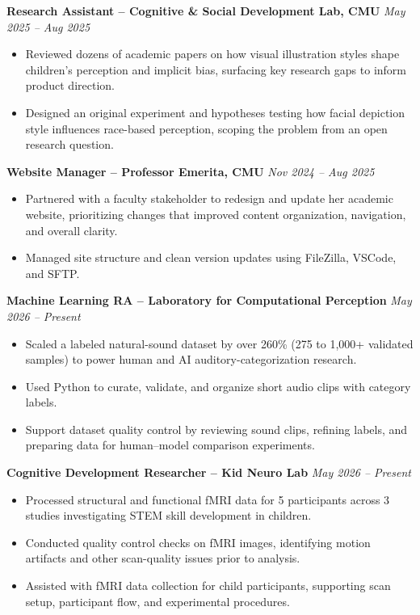 \documentclass[10.5pt]{article}
\begin{document}
\noindent\textbf{Research Assistant – Cognitive \& Social Development Lab, CMU} \hfill \textit{May 2025 – Aug 2025}\\[-1.3em]
\begin{itemize}
  \item Reviewed dozens of academic papers on how visual illustration styles shape children's perception and implicit bias, surfacing key research gaps to inform product direction.
  \item Designed an original experiment and hypotheses testing how facial depiction style influences race-based perception, scoping the problem from an open research question.
\end{itemize}

\noindent\textbf{Website Manager – Professor Emerita, CMU} \hfill \textit{Nov 2024 – Aug 2025}\\[-1.3em]
\begin{itemize}
  \item Partnered with a faculty stakeholder to redesign and update her academic website, prioritizing changes that improved content organization, navigation, and overall clarity.
  \item Managed site structure and clean version updates using FileZilla, VSCode, and SFTP.
\end{itemize}

\noindent\textbf{Machine Learning RA – Laboratory for Computational Perception} \hfill 
\textit{May 2026 – Present}\\[-1.3em]
\begin{itemize}
  \item Scaled a labeled natural-sound dataset by over 260\% (275 to 1,000+ validated samples) to power human and AI auditory-categorization research.
  \item Used Python to curate, validate, and organize short audio clips with category labels.
  \item Support dataset quality control by reviewing sound clips, refining labels, and preparing data for human--model comparison experiments.
\end{itemize}

\noindent\textbf{Cognitive Development Researcher -- Kid Neuro Lab} \hfill
\textit{May 2026 -- Present}\\[-1.3em]
\begin{itemize}
  \item Processed structural and functional fMRI data for 5 participants across 3 studies investigating STEM skill development in children.
  \item Conducted quality control checks on fMRI images, identifying motion artifacts and other scan-quality issues prior to analysis.
  \item Assisted with fMRI data collection for child participants, supporting scan setup, participant flow, and experimental procedures.
\end{itemize}
\end{document}
